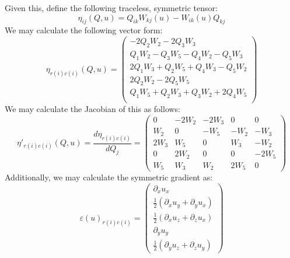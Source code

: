 \documentclass[reqno]{article}
\begin{document}
  Given this, define the following traceless, symmetric tensor:
  \begin{equation}
    \eta_{ij}(Q, u)
    =
    Q_{ik} W_{kj}(u) - W_{ik}(u) Q_{kj}
  \end{equation}
  We may calculate the following vector form:
  \begin{equation}
    \eta_{r(i) c(i)} (Q, u)
    =
    \left(
      \begin{matrix}
        - 2 Q_{2} W_{2} - 2 Q_{3} W_{3} \\
        Q_{1} W_{2} - Q_{3} W_{5} - Q_{4} W_{2} - Q_{5} W_{3} \\
        2 Q_{1} W_{3} + Q_{2} W_5 + Q_4 W_3 - Q_{5} W_{2} \\
        2 Q_{2} W_{2} - 2 Q_{5} W_{5} \\
        Q_1 W_5 + Q_{2} W_{3} + Q_{3} W_{2} + 2 Q_{4} W_{5} \\
      \end{matrix}
    \right)
  \end{equation}
  We may calculate the Jacobian of this as follows:
  \begin{equation}
    \eta'_{r(i) c(i)} (Q, u)
    =
    \frac{d \eta_{r(i) c(i)}}{d Q_j}
    =
    \left(
      \begin{matrix}
        0 & - 2 W_{2} & - 2 W_{3} & 0 & 0 \\
        W_{2} & 0 & - W_{5} & - W_{2} & - W_{3} \\
        2 W_{3} & W_{5} & 0 & W_{3} & - W_{2} \\
        0 & 2 W_{2} & 0 & 0 & - 2 W_{5} \\
        W_{5} & W_{3} & W_{2} & 2 W_{5} & 0
      \end{matrix}
    \right)
  \end{equation}
  Additionally, we may calculate the symmetric gradient as:
  \begin{equation}
    \varepsilon(u)_{r(i) c(i)}
    =
    \begin{pmatrix}
      \partial_x u_x \\
      \tfrac12 \left( \partial_x u_y + \partial_y u_x \right) \\
      \tfrac12 \left( \partial_x u_z + \partial_z u_x \right) \\
      \partial_y u_y \\
      \tfrac12 \left( \partial_y u_z + \partial_z u_y \right)
    \end{pmatrix}
  \end{equation}
\end{document}
